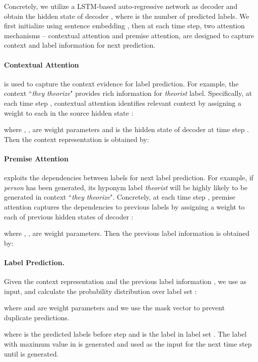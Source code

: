 \documentclass[11pt]{article}
\begin{document}
Concretely, we utilize a LSTM-based auto-regressive network as decoder and obtain the hidden state of decoder , where  is the number of predicted labels. We first initialize  using sentence embedding , then at each time step, two attention mechanisms -- contextual attention and premise attention, are designed to capture context and label information for next prediction.

\paragraph{Contextual Attention} is used to capture the context evidence for label prediction. For example, the context ``\textit{they theorize}" provides rich information for \textit{theorist} label. Specifically, at each time step , contextual attention identifies relevant context by assigning a weight  to each  in the source hidden state : 

where , ,  are weight parameters and  is the hidden state of decoder at time step . Then the context representation  is obtained by:

\paragraph{Premise Attention} exploits the dependencies between labels for next label prediction. For example, if \textit{person} has been generated, its hyponym label \textit{theorist} will be highly likely to be generated in context ``\textit{they theorize}". Concretely, at each time step , premise attention captures the dependencies to previous labels by assigning a weight  to each  of previous hidden states of decoder :

where , ,  are weight parameters. Then the previous label information  is obtained by:

\paragraph{Label Prediction. }Given the context representation  and the previous label information , we use  as input, and calculate the probability distribution over label set :

where  and  are weight parameters and we use the mask vector  \cite{YangSLMWW18_sgm} to prevent duplicate predictions.

where  is the predicted labels before step  and  is the  label in label set . The label with maximum value in  is generated and used as the input for the next time step until  is generated.
\end{document}
